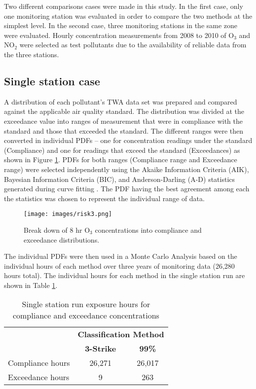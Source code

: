 Two different comparisons cases were made in this study. In the first case, only one monitoring station was evaluated in order to compare the two methods at the simplest level. In the second case, three monitoring stations in the same zone were evaluated.  Hourly concentration measurements from 2008 to 2010 of O$_{3}$ and NO$_{2}$ were selected as test pollutants due to the availability of reliable data from the three stations. 

\subsection{Single station case}

A distribution of each pollutant's TWA data set was prepared and compared against the applicable air quality standard. The distribution was divided at the exceedance value into ranges of measurement that were in compliance with the standard and those that exceeded the standard. The different ranges were then converted in individual PDFs – one for concentration readings under the standard (Compliance) and one for readings that exceed the standard (Exceedances) as shown in Figure \ref{fig3:distributions}.  PDFs for both ranges (Compliance range and Exceedance range) were selected independently using the Akaike Information Criteria (AIK), Bayesian Information Criteria (BIC), and Anderson-Darling (A-D) statistics generated during curve fitting \citep{Palisades2016}.  The PDF having the best agreement among each the statistics was chosen to represent the individual range of data.  
%  
\begin{figure}[H]
\texttt{[image: images/risk3.png]} 
\caption{Break down of 8 hr O$_{3}$ concentrations into compliance and exceedance distributions.}
\label{fig3:distributions}
\end{figure}
%
The individual PDFs were then used in a Monte Carlo Analysis based on the individual hours of each method over three years of monitoring data (26,280 hours total).  The individual hours for each method in the single station run are shown in Table \ref{tb3:exphrs}. 
%
\begin{table}[H]
\centering
\caption{Single station run exposure hours for compliance and exceedance concentrations}
\label{tb3:exphrs}
\begin{tabular}{@{}lcc@{}}
\toprule
 & \multicolumn{2}{c}{\textbf{Classification Method}} \\ 
 & \textbf{3-Strike} & \textbf{99\%} \\ \midrule
Compliance hours & 26,271 & 26,017 \\
Exceedance hours & 9 & 263 \\ \bottomrule
\end{tabular}
\end{table}
